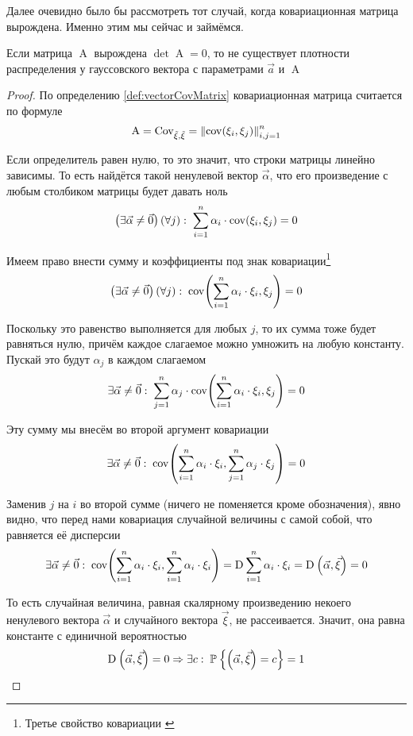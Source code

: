 Далее очевидно было бы рассмотреть тот случай, когда ковариационная матрица
вырождена. Именно этим мы сейчас и займёмся.

\begin{affirmation}
  Если матрица $\operatorname{A}$ вырождена $\det\operatorname{A} = 0$, то не
  существует плотности распределения у гауссовского вектора с параметрами
  $\vec{a}$ и $\operatorname{A}$
\end{affirmation}
\begin{proof}
  По определению \ref{def:vectorCovMatrix} ковариационная матрица считается по
  формуле
  $$\operatorname{A}
      = \operatorname{Cov^{}_{\vec{\xi}, \vec{\xi}}}
      = \left\| \operatorname{cov}\!\left( \xi_i, \xi_j \right) \right\|_{i,j=1}^n$$

  Если определитель равен нулю, то это значит, что строки матрицы линейно
  зависимы. То есть найдётся такой ненулевой вектор $\vec{\alpha}$, что
  его произведение с любым столбиком матрицы будет давать ноль
  $$\left( \exists \vec{\alpha} \neq \vec{0} \right) \left( \forall j \right):
      \;\sum_{i=1}^{n} \alpha_i \cdot \operatorname{cov}\!\left( \xi_i, \xi_j \right) = 0$$

  Имеем право внести сумму и коэффициенты под знак ковариации\footnote{Третье
  свойство ковариации \cite[с.~310]{MGTUXVI}}
  $$\left( \exists \vec{\alpha} \neq \vec{0} \right) \left( \forall j \right):
      \;\operatorname{cov}\!\left( \sum_{i=1}^{n} \alpha_i \cdot \xi_i, \xi_j \right) = 0$$

  Поскольку это равенство выполняется для любых $j$, то их сумма тоже будет
  равняться нулю, причём каждое слагаемое можно умножить на любую константу.
  Пускай это будут $\alpha_j$ в каждом слагаемом
  $$\exists \vec{\alpha} \neq \vec{0}:\; \sum_{j=1}^{n} \alpha_j
      \cdot \operatorname{cov}\!\left( \sum_{i=1}^{n} \alpha_i \cdot \xi_i, \xi_j \right) = 0$$

  Эту сумму мы внесём во второй аргумент ковариации
  $$\exists \vec{\alpha} \neq \vec{0}:\;
      \operatorname{cov}\!\left( \sum_{i=1}^{n} \alpha_i \cdot \xi_i,
      \sum_{j=1}^{n} \alpha_j \cdot \xi_j \right) = 0$$

  Заменив $j$ на $i$ во второй сумме (ничего не поменяется кроме обозначения),
  явно видно, что перед нами ковариация случайной величины с самой собой, что
  равняется её дисперсии
  $$\exists \vec{\alpha} \neq \vec{0}:\;
      \operatorname{cov}\!\left( \sum_{i=1}^{n} \alpha_i \cdot \xi_i,
      \sum_{i=1}^{n} \alpha_i \cdot \xi_i \right)
      = \operatorname{D}_{} \sum_{i=1}^{n} \alpha_i \cdot \xi_i
      = \operatorname{D}_{} \left( \vec{\alpha}, \vec{\xi} \right)
      = 0$$

  То есть случайная величина, равная скалярному произведению некоего
  ненулевого вектора $\vec{\alpha}$ и случайного вектора $\vec{\xi}$,
  не рассеивается. Значит, она равна константе с единичной вероятностью
  $$\operatorname{D}_{} \left( \vec{\alpha}, \vec{\xi} \right) = 0
      \Rightarrow \exists c:\;
      \mathbb{P}_{{}}\left\{ \left( \vec{\alpha}, \vec{\xi} \right) = c \right\} = 1$$


\end{proof}
